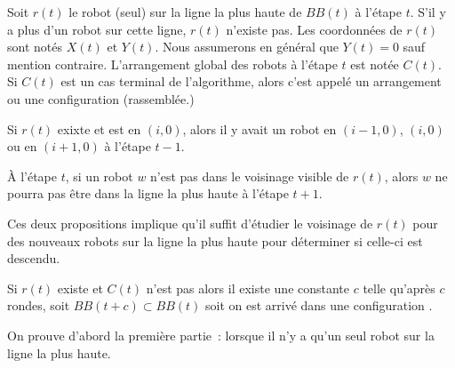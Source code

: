 Soit $r(t)$ le robot (seul) sur la ligne la plus haute de $BB(t)$ à l'étape
$t$. S'il y a plus d'un robot sur cette ligne, $r(t)$ n'existe pas. Les
coordonnées de $r(t)$ sont notés $X(t)$ et $Y(t)$. Nous assumerons en général
que $Y(t)=0$ sauf mention contraire. L'arrangement global des robots à l'étape
$t$ est notée $C(t)$. Si $C(t)$ est un cas terminal de l'algorithme, alors
c'est appelé un arrangement ou une configuration \Gathered (rassemblée.)

\begin{prop}
Si $r(t)$ exixte et est en $(i,0)$, alors il y avait un robot en
$(i-1,0)$, $(i,0)$ ou en $(i+1,0)$ à l'étape $t-1$.
\end{prop}

\begin{prop}
\`A l'étape $t$, si un robot $w$ n'est pas dans le voisinage visible de $r(t)$,
alors $w$ ne pourra pas être dans la ligne la plus haute à l'étape $t+1$.
\end{prop}

Ces deux propositions implique qu'il suffit d'étudier le voisinage de $r(t)$
pour des nouveaux robots sur la ligne la plus haute pour déterminer si celle-ci
est descendu.

\begin{lem}
Si $r(t)$ existe et $C(t)$ n'est pas \Gathered alors il existe une constante
$c$ telle qu'après $c$ rondes, soit $BB(t+c) \subset BB(t)$ soit on est arrivé
dans une configuration \Gathered.
\end{lem}

On prouve d'abord la première partie~: lorsque il n'y a qu'un seul robot sur la
ligne la plus haute.

